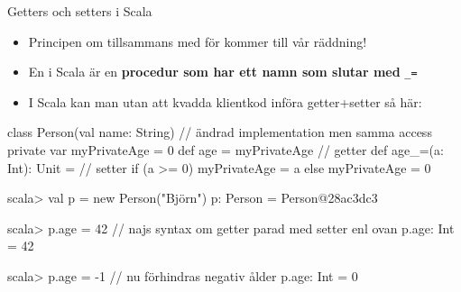 \begin{Slide}{Getters och setters i Scala}\SlideFontSmall
\setlength{\leftmargini}{0pt}
\begin{itemize}
\item Principen om  tillsammans med  för  kommer till vår räddning!

\item
En  i Scala är en \textbf{procedur som har ett namn som slutar med} \texttt{\_=}
\pause
\item I Scala kan man utan att kvadda klientkod införa getter+setter så här:
\end{itemize}
\begin{Code}
class Person(val name: String) { // ändrad implementation men samma access
  private var myPrivateAge = 0
  def age = myPrivateAge         // getter
  def age_=(a: Int): Unit =      // setter
    if (a >= 0) myPrivateAge = a else myPrivateAge = 0
}
\end{Code}
\pause\vspace{-0.5em}
\begin{REPL}
scala> val p = new Person("Björn")
p: Person = Person@28ac3dc3

scala> p.age = 42      // najs syntax om getter parad med setter enl ovan
p.age: Int = 42

scala> p.age = -1      // nu förhindras negativ ålder
p.age: Int = 0
\end{REPL}
\end{Slide}
